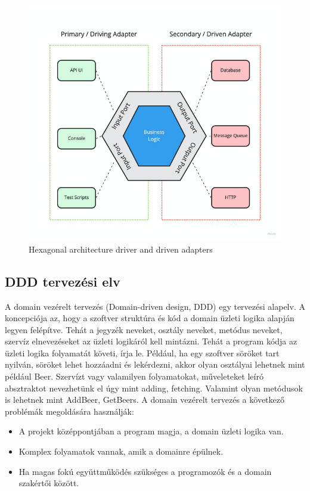 \begin{figure}[h]
    \centering
    \includegraphics[scale=0.3]{images/ports-adapters}
    \caption{Hexagonal architecture driver and driven adapters}
    \label{fig:hexagonal-ports-adapters}
\end{figure}

\subsection{DDD tervezési elv}
A domain vezérelt tervezés (Domain-driven design, DDD) \cite{wiki:Domain-driven_design} egy tervezési alapelv.
A koncepciója az, hogy a szoftver struktúra és kód a domain üzleti logika alapján legyen felépítve.
Tehát a jegyzék neveket, osztály neveket, metódus neveket, szervíz elnevezéseket az üzleti logikáról kell mintázni.
Tehát a program kódja az üzleti logika folyamatát követi, írja le.
Például, ha egy szoftver söröket tart nyilván, söröket lehet hozzáadni és lekérdezni, akkor olyan osztályai lehetnek mint például Beer.
Szervízt vagy valamilyen folyamatokat, műveleteket leíró absztraktot nevezhetünk el úgy mint adding, fetching.
Valamint olyan metódusok is lehetnek mint AddBeer, GetBeers.
A domain vezérelt tervezés a következő problémák megoldására használják:

\begin{itemize}
    \item A projekt középpontjában a program magja, a domain üzleti logika van.
    \item Komplex folyamatok vannak, amik a domainre épülnek.
    \item Ha magas fokú együttműködés szükséges a programozók és a domain szakértői között.
\end{itemize}

